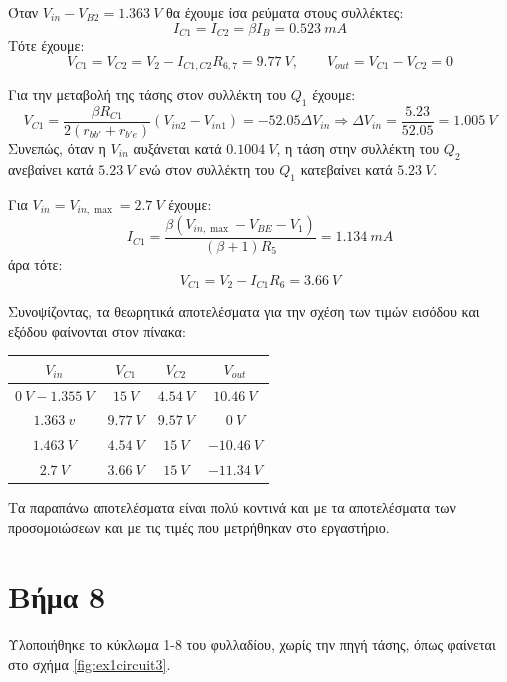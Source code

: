 \documentclass[11pt,a4paper,twoside,onecolumn,openright,final]{memoir}
\begin{document}
Όταν \(V_{in} - V_{B2} = 1.363 \ V\) θα έχουμε ίσα ρεύματα στους συλλέκτες:
\[
I_{C1} = I_{C2} = \beta I_{B} = 0.523 \ mA
\]
Τότε έχουμε:
\[
V_{C1} = V_{C2} = V_2 - I_{C1,C2}R_{6,7} = 9.77 \ V, \quad\quad V_{out} = V_{C1} - V_{C2} = 0
\]

Για την μεταβολή της τάσης στον συλλέκτη του \(Q_1\) έχουμε:
\[
V_{C1} = \frac{\beta R_{C1}}{2(r_{bb'}+r_{b'e})}(V_{in2}-V_{in1}) = -52.05\Delta V_{in} \Rightarrow \Delta V_{in} = \frac{5.23}{52.05} = 1.005 \ V 
\]
Συνεπώς, όταν η \(V_{in}\) αυξάνεται κατά \(0.1004 \ V\), η τάση στην συλλέκτη του \(Q_2\) ανεβαίνει κατά \(5.23 \ V\) ενώ στον συλλέκτη του \(Q_1\) κατεβαίνει κατά \(5.23 \ V\).

Για \(V_{in} = V_{in,\max} = 2.7 \ V\) έχουμε:
\[
I_{C1} = \frac{\beta (V_{in,\max} - V_{BE} - V_1)}{(\beta + 1)R_5} = 1.134 \ mA
\]
άρα τότε:
\[
V_{C1} = V_2 - I_{C1}R_6 = 3.66\ V
\]

Συνοψίζοντας, τα θεωρητικά αποτελέσματα για την σχέση των τιμών εισόδου και εξόδου φαίνονται στον πίνακα:
\begin{center}
\begin{tabular}{|c|c|c|c|}
\hline
\(V_{in}\) & \(V_{C1}\) & \(V_{C2}\) & \(V_{out}\)  \\
\hline
\(0\ V - 1.355 \ V\) & \(15 \ V\) & \(4.54 \ V\) & \(10.46 \ V\)  \\
\hline
\(1.363 \ v\) & \(9.77 \ V\) & \(9.57 \ V\) & \(0 \ V\)  \\
\hline
\(1.463 \ V\) & \(4.54 \ V\) & \(15 \ V\) & \(-10.46 \ V\) \\
\hline
\(2.7 \ V\) & \(3.66 \ V\) & \(15 \ V\) & \(-11.34 \ V\) \\
\hline
\end{tabular}
\end{center}

Τα παραπάνω αποτελέσματα είναι πολύ κοντινά και με τα αποτελέσματα των προσομοιώσεων και με τις τιμές που μετρήθηκαν στο εργαστήριο.



\section{Βήμα 8}

\paragraph*{} Υλοποιήθηκε το κύκλωμα 1-8 του φυλλαδίου, χωρίς την πηγή τάσης, όπως φαίνεται στο σχήμα \ref{fig:ex1circuit3}.
\end{document}
